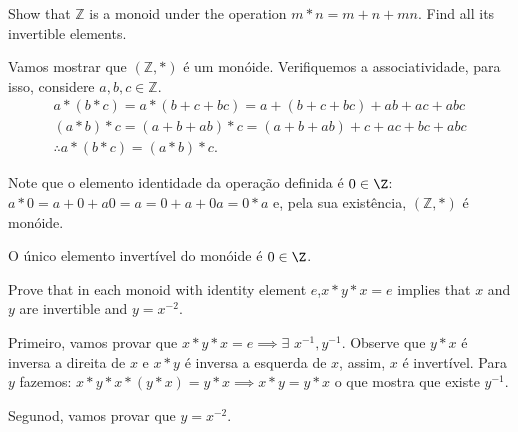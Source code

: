 \begin{exercicio}{1.43}
	Show that $\mathbb{Z}$ is a monoid under the operation $m * n = m + n + mn$. Find all
	its invertible elements.
\end{exercicio}

\begin{solucao}
	Vamos mostrar que $(\mathbb{Z}, *)$ é um monóide. Verifiquemos a associatividade, para isso, considere \(a, b, c \in \mathbb{Z}\).
	\begin{gather*}
		a * (b * c) = a * (b + c + bc) = a + (b + c + bc) + ab + ac + abc \\ 
		(a*b)*c = (a + b + ab) * c = (a + b + ab) + c + ac + bc + abc \\
		\therefore a * (b * c) = (a*b)*c.
	\end{gather*}

	Note que o elemento identidade da operação definida é \(0 \in \Z\): \(a * 0 = a + 0 + a0 = a = 0 + a + 0a = 0 * a\) e, pela sua existência, $(\mathbb{Z}, *)$ é monóide.

	O único elemento invertível do monóide é \(0 \in \Z\).
\end{solucao}

\begin{exercicio}{1.44}
	Prove that in each monoid with identity element $e$,$x * y * x = e$ implies that $x$ and $y$ are invertible and $y = x^{-2}$.
\end{exercicio}

\begin{solucao}
	Primeiro, vamos provar que $x*y*x = e \implies \exists \, \, x^{-1}, y^{-1}$. Observe que \(y * x\) é inversa a direita de $x$ e \(x * y\) é inversa a esquerda de \(x\), assim, \(x\) é invertível. Para \(y\) fazemos: \(x * y * x * (y * x) = y * x \implies x * y = y * x\) o que mostra que existe $y^{-1}$.

	Segunod, vamos provar que $y = x^{-2}$.
\end{solucao}